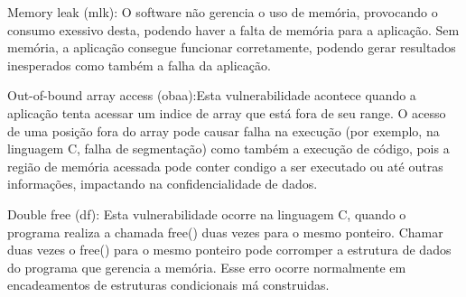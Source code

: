 %

Memory leak (mlk): O software não gerencia o uso de memória, provocando o consumo exessivo desta, podendo haver a falta de memória para a aplicação. Sem memória, a aplicação consegue funcionar corretamente, podendo gerar resultados inesperados como também a falha da aplicação.

%

Out-of-bound array access (obaa):Esta vulnerabilidade acontece quando a aplicação tenta acessar um indice de array que está fora de seu range. O acesso de uma posição fora do array pode causar falha na execução (por exemplo, na linguagem C, falha de segmentação) como também a execução de código, pois a região de memória acessada pode conter condigo a ser executado ou até outras informações, impactando na confidencialidade de dados.

%

Double free (df): Esta vulnerabilidade ocorre na linguagem C, quando o programa realiza a chamada free() duas vezes para o mesmo ponteiro. Chamar duas vezes o free() para o mesmo ponteiro pode corromper a estrutura de dados do programa que gerencia a memória. Esse erro ocorre normalmente em encadeamentos de estruturas condicionais má construidas.

%


